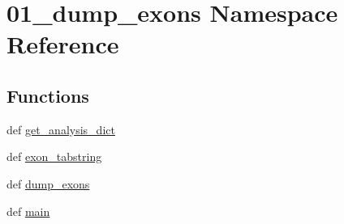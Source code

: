 \hypertarget{namespace01__dump__exons}{\section{01\-\_\-dump\-\_\-exons Namespace Reference}
\label{namespace01__dump__exons}
}
\subsection*{Functions}
\begin{DoxyCompactItemize}
\item 
def \hyperlink{namespace01__dump__exons_a8c84fd8518adb67ad39a3f955a539117}{get\-\_\-analysis\-\_\-dict}
\item 
def \hyperlink{namespace01__dump__exons_a3206facf47b194c08cca97eae48537a3}{exon\-\_\-tabstring}
\item 
def \hyperlink{namespace01__dump__exons_ad6257671322bcf0a59648ce7ade5441b}{dump\-\_\-exons}
\item 
def \hyperlink{namespace01__dump__exons_ac2381394b002a05add25910bc9415b00}{main}
\end{DoxyCompactItemize}


